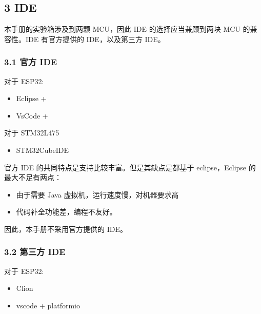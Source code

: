 \documentclass[a4paper,12pt,english]{sphinxmanual}
\begin{document}
\subsection{3 IDE}
\label{\detokenize{dev-board/ide:ide}}
\sphinxAtStartPar
本手册的实验箱涉及到两颗 MCU，因此 IDE 的选择应当兼顾到两块 MCU 的兼容性。IDE 有官方提供的 IDE，以及第三方 IDE。


\subsubsection{3.1 官方 IDE}
\label{\detokenize{dev-board/ide:id3}}
\sphinxAtStartPar
对于 ESP32:
\begin{itemize}
\item {} 
\sphinxAtStartPar
Eclipse + 

\item {} 
\sphinxAtStartPar
VsCode + 

\end{itemize}

\sphinxAtStartPar
对于 STM32L475
\begin{itemize}
\item {} 
\sphinxAtStartPar
STM32CubeIDE

\end{itemize}

\sphinxAtStartPar
官方 IDE 的共同特点是支持比较丰富。但是其缺点是都基于 eclipse，Eclipse 的最大不足有两点：
\begin{itemize}
\item {} 
\sphinxAtStartPar
由于需要 Java 虚拟机，运行速度慢，对机器要求高

\item {} 
\sphinxAtStartPar
代码补全功能差，编程不友好。

\end{itemize}

\sphinxAtStartPar
因此，本手册不采用官方提供的 IDE。


\subsubsection{3.2 第三方 IDE}
\label{\detokenize{dev-board/ide:id4}}
\sphinxAtStartPar
对于 ESP32:
\begin{itemize}
\item {} 
\sphinxAtStartPar
Clion

\item {} 
\sphinxAtStartPar
vscode + platformio

\end{itemize}
\end{document}
